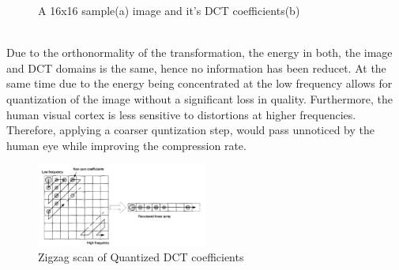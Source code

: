 \documentclass[a4paper,11pt,oneside]{article}
\begin{document}
\begin{figure}[h]
    \centering
    \qquad
    \caption{A 16x16 sample(a) image and it's DCT coefficients(b) \cite[pp.~35]{richardson2002video}}
    \label{figure:DCTexample}
\end{figure} \\
\indent Due to the orthonormality of the transformation, the energy in both, the image and DCT domains is the same, hence no information has been reducet. At the same time due to the energy being concentrated at the low frequency allows for quantization of the image without a significant loss in quality. Furthermore, the human visual cortex is less sensitive to distortions at higher frequencies. Therefore, applying a coarser quntization step, would pass unnoticed by the human eye while improving the compression rate. \\
\begin{figure}
    \includegraphics[width=0.5\textwidth]{../figures/zigzag_reorder_QDCT.pdf}
    \caption{Zigzag scan of Quantized DCT coefficients \cite[pp.40]{richardson2002video}}
    \label{figure:zigzag_scan}
\end{figure}
\end{document}
